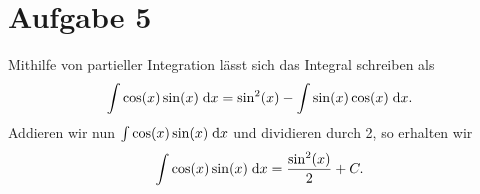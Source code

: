 \documentclass{article}
\theoremstyle{definition}
\begin{document}
\section*{Aufgabe 5}
	Mithilfe von partieller Integration lässt sich das Integral schreiben als
	$$\int \cos(x)\sin(x)\d x = \sin^2(x) - \int \sin(x) \cos(x) \d x.$$ Addieren wir nun $\int \cos(x)\sin(x)\d x$ und dividieren durch 2, so erhalten wir $$\int \cos(x)\sin(x)\d x = \frac{\sin^2(x)}{2} + C.$$
\end{document}
